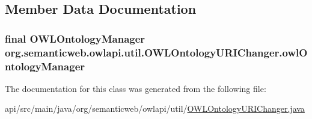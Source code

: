\subsection{Member Data Documentation}
\hypertarget{classorg_1_1semanticweb_1_1owlapi_1_1util_1_1_o_w_l_ontology_u_r_i_changer_a87c6a8c479f5853c9b9500414be9e803}{
\subsubsection[{owl\-Ontology\-Manager}]{\setlength{\rightskip}{0pt plus 5cm}final {\bf O\-W\-L\-Ontology\-Manager} org.\-semanticweb.\-owlapi.\-util.\-O\-W\-L\-Ontology\-U\-R\-I\-Changer.\-owl\-Ontology\-Manager\hspace{0.3cm}{\ttfamily [private]}}}\label{classorg_1_1semanticweb_1_1owlapi_1_1util_1_1_o_w_l_ontology_u_r_i_changer_a87c6a8c479f5853c9b9500414be9e803}


The documentation for this class was generated from the following file\-:\begin{DoxyCompactItemize}
\item 
api/src/main/java/org/semanticweb/owlapi/util/\hyperlink{_o_w_l_ontology_u_r_i_changer_8java}{O\-W\-L\-Ontology\-U\-R\-I\-Changer.\-java}\end{DoxyCompactItemize}
